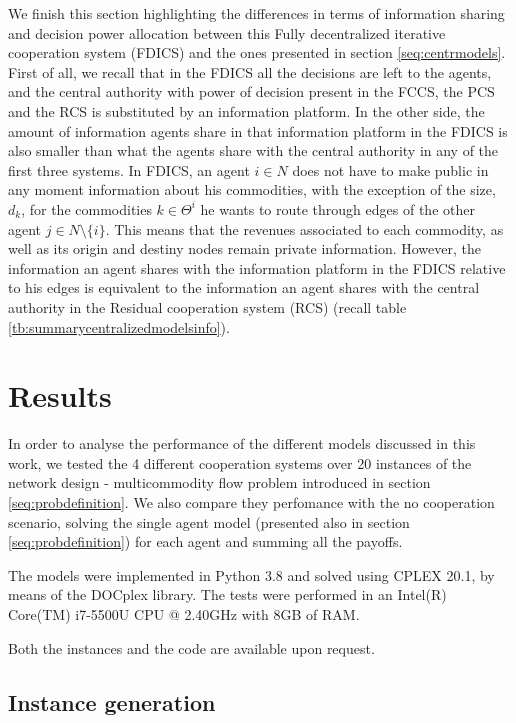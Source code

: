 \documentclass{article}
\begin{document}
We finish this section highlighting the differences in terms of information sharing and decision power allocation between this Fully decentralized iterative cooperation system (FDICS) and the ones presented in section \ref{seq:centrmodels}. First of all, we recall that in the FDICS all the decisions are left to the agents, and the central authority with power of decision present in the FCCS, the PCS and the RCS is substituted by an information platform. In the other side, the amount of information agents share in that information platform in the FDICS is also smaller than what the agents share with the central authority in any of the first three systems. In FDICS, an agent $i\in N$ does not have to make public in any moment information about his commodities, with the exception of the size, $d_k$, for the commodities $k\in \Theta^i$ he wants to route through edges of the other agent $j\in N\setminus\{i\}$. This means that the revenues associated to each commodity, as well as its origin and destiny nodes remain private information. However, the information an agent shares with the information platform in the FDICS relative to his edges is equivalent to the information an agent shares with the central authority in the Residual cooperation system (RCS) (recall table \ref{tb:summarycentralizedmodelsinfo}).

\section{Results} \label{seq:results}

In order to analyse the performance of the different models discussed in this work, we tested the 4 different cooperation systems over 20 instances of the network design - multicommodity flow problem introduced in section \ref{seq:probdefinition}. We also compare they perfomance with the no cooperation scenario, solving the single agent model (presented also in section \ref{seq:probdefinition}) for each agent and summing all the payoffs.

The models were implemented in Python 3.8 and solved using CPLEX 20.1, by means of the DOCplex library. The tests were performed in an  Intel(R) Core(TM) i7-5500U CPU @ 2.40GHz with 8GB of RAM.

Both the instances and the code are available upon request.


\subsection{Instance generation}
\end{document}
